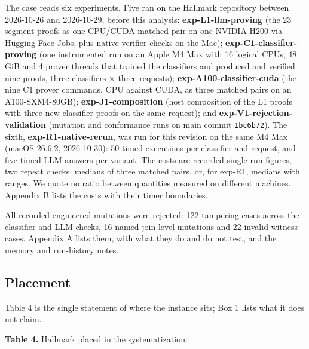 \documentclass[11pt]{article}
\begin{document}
The case reads six experiments. Five ran on the Hallmark repository between 2026-10-26 and 2026-10-29, before this analysis: \textbf{exp-L1-llm-proving} (the 23 segment proofs as one CPU/CUDA matched pair on one NVIDIA H200 via Hugging Face Jobs, plus native verifier checks on the Mac); \textbf{exp-C1-classifier-proving} (one instrumented run on an Apple M4 Max with 16 logical CPUs, 48 GiB and 4 prover threads that trained the classifiers and produced and verified nine proofs, three classifiers × three requests); \textbf{exp-A100-classifier-cuda} (the nine C1 prover commands, CPU against CUDA, as three matched pairs on an A100-SXM4-80GB); \textbf{exp-J1-composition} (host composition of the L1 proofs with three new classifier proofs on the same request); and \textbf{exp-V1-rejection-validation} (mutation and conformance runs on main commit \texttt{1bc6b72}). The sixth, \textbf{exp-R1-native-rerun}, was run for this revision on the same M4 Max (macOS 26.6.2, 2026-10-30): 50 timed executions per classifier and request, and five timed LLM answers per variant. The costs are recorded single-run figures, two repeat checks, medians of three matched pairs, or, for exp-R1, medians with ranges. We quote no ratio between quantities measured on different machines. Appendix B lists the costs with their timer boundaries.

All recorded engineered mutations were rejected: 122 tampering cases across the classifier and LLM checks, 16 named join-level mutations and 22 invalid-witness cases. Appendix A lists them, with what they do and do not test, and the memory and run-history notes.

\subsection{Placement}

Table 4 is the single statement of where the instance sits; Box 1 lists what it does not claim.

\textbf{Table 4.} Hallmark placed in the systematization.
\end{document}
